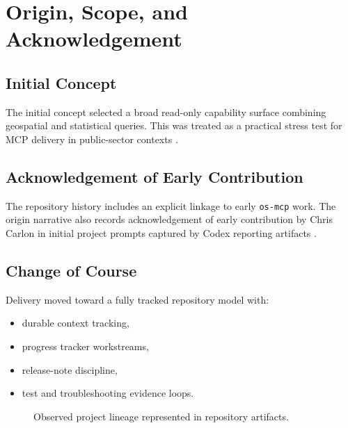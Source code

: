 \chapter{Origin, Scope, and Acknowledgement}
\label{ch:origin}

\section{Initial Concept}

The initial concept selected a broad read-only capability surface combining
geospatial and statistical queries. This was treated as a practical stress test
for MCP delivery in public-sector contexts \cite{apps_to_answers_brief,deep_research_report}.

\section{Acknowledgement of Early Contribution}

The repository history includes an explicit linkage to early \texttt{os-mcp}
work. The origin narrative also records acknowledgement of early contribution by
Chris Carlon in initial project prompts captured by Codex reporting artifacts
\cite{codex_long_horizon_20260304}.

\section{Change of Course}

Delivery moved toward a fully tracked repository model with:
\begin{itemize}
  \item durable context tracking,
  \item progress tracker workstreams,
  \item release-note discipline,
  \item test and troubleshooting evidence loops.
\end{itemize}

\begin{figure}[h]
\centering
{}
\caption{Observed project lineage represented in repository artifacts.}
\end{figure}
